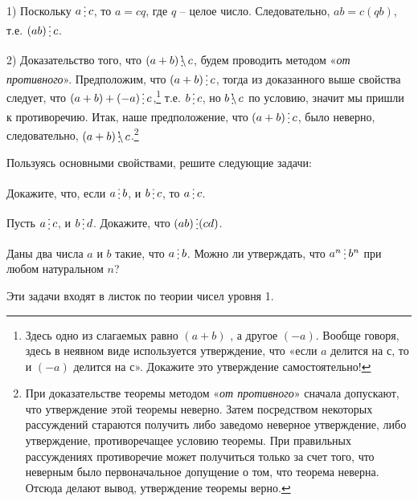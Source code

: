 
\begin{dok}
1) Поскольку $a\del c$, то $a = cq$, где $q$ – целое число. Следовательно, $ab = c(qb)$, т.е. $(ab)\del c$.

2) Доказательство того, что $(a + b)\ndel c$, будем проводить методом «\textit{от противного}». Предположим, что $(a + b)\del c$, тогда из доказанного выше свойства следует, что $(a + b) + (-a)\del c$,\footnote{Здесь одно из слагаемых равно $(a + b)$ , а другое $(-a)$. Вообще говоря, здесь в неявном виде используется утверждение, что «если $a$ делится на $с$, то и $(-a)$ делится на $с$». Докажите это утверждение самостоятельно!} т.е. $b\del c$, но $b \ndel c$ по условию, значит мы пришли к противоречию. Итак, наше предположение, что $(a + b)\del c$, было неверно,  следовательно, $(a + b) \ndel c$.\footnote{При доказательстве теоремы методом «\textit{от противного}» сначала допускают, что утверждение этой теоремы неверно. Затем посредством некоторых рассуждений стараются получить либо заведомо неверное утверждение, либо утверждение, противоречащее условию теоремы. При правильных рассуждениях противоречие может получиться только за счет того, что неверным было первоначальное допущение о том, что теорема неверна. Отсюда делают вывод, утверждение теоремы верно.}
\end{dok}

Пользуясь основными свойствами, решите следующие задачи:

\begin{thm}\label{4.1}
	Докажите, что, если $a\del b$, и $b\del c$, то $a\del c$.
\end{thm}

\begin{thm}\label{4.2}
	Пусть $a \del c$, и $b \del d$. Докажите, что $(ab) \del (cd)$.
\end{thm}

\begin{thm}\label{4.3}
	Даны два числа $a$ и $b$ такие, что $a\del b$. Можно ли утверждать, что $a^n\del b^n$ при любом натуральном $n$?
\end{thm}

\begin{prim}
    Эти задачи входят в листок по теории чисел уровня 1.
\end{prim}

